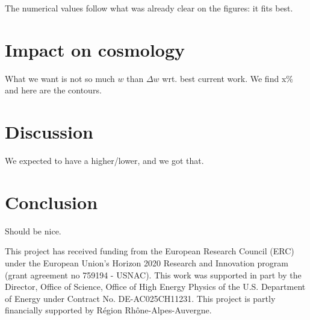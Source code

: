 \documentclass[]{aa}
\begin{document}
The numerical values follow what was already clear on the figures: it fits best.

\section{Impact on cosmology}
What we want is not so much $w$ than $\Delta w$ wrt. best current work. We find
x\% and here are the contours.

\section{Discussion}\label{sec:discussion}
We expected to have a higher/lower, and we got that.

\section{Conclusion}\label{sec:ccl}

Should be nice.

\begin{acknowledgements}
    This project has received funding from the European Research Council (ERC)
    under the European Union's Horizon 2020 Research and Innovation program
    (grant agreement no 759194 - USNAC).
    This work was supported in part by the Director, Office of Science, Office
    of High Energy Physics of the U.S. Department of Energy under Contract No.
    DE-AC025CH11231.
    This project is partly financially supported by Région Rhône-Alpes-Auvergne.
\end{acknowledgements}
\end{document}
